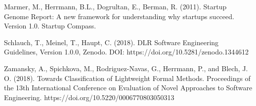 \documentclass[conference]{IEEEtran}
\begin{document}
\begin{thebibliography}{00}
 Marmer, M., Herrmann, B.L., Dogrultan, E., Berman, R. (2011). Startup Genome Report: A new framework for understanding why startups succeed. Version 1.0. Startup Compass.  

 Schlauch, T., Meinel, T., Haupt, C. (2018). DLR Software Engineering Guidelines, Version 1.0.0, Zenodo. DOI: https://doi.org/10.5281/zenodo.1344612

 Zamansky, A., Spichkova, M., Rodriguez-Navas, G., Herrmann, P., and Blech, J. O. (2018). Towards Classification of Lightweight Formal Methods. Proceedings of the 13th International Conference on Evaluation of Novel Approaches to Software Engineering. https://doi.org/10.5220/0006770803050313


\end{thebibliography}
\vspace{12pt}
\end{document}
